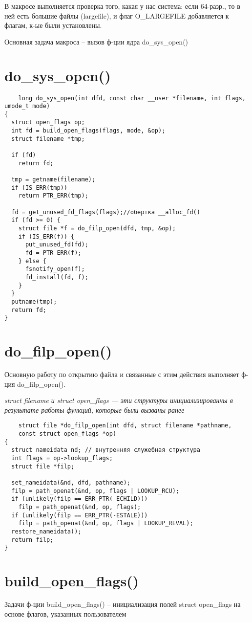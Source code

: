 В макросе выполняется проверка того, какая у нас система: если 64-разр., то в ней есть большие файлы (largefile), и флаг O\_LARGEFILE добавляется к флагам, к-ые были установлены.

Основная задача макроса -- вызов ф-ции ядра do\_sys\_open()

\section{do\_sys\_open()}
\begin{lstlisting}
    long do_sys_open(int dfd, const char __user *filename, int flags, umode_t mode)
{
  struct open_flags op;
  int fd = build_open_flags(flags, mode, &op);
  struct filename *tmp;

  if (fd)
    return fd;

  tmp = getname(filename);
  if (IS_ERR(tmp))
    return PTR_ERR(tmp);

  fd = get_unused_fd_flags(flags);//обертка __alloc_fd()
  if (fd >= 0) {
    struct file *f = do_filp_open(dfd, tmp, &op);
    if (IS_ERR(f)) {
      put_unused_fd(fd);
      fd = PTR_ERR(f);
    } else {
      fsnotify_open(f);
      fd_install(fd, f);
    }
  }
  putname(tmp);
  return fd;
}
\end{lstlisting}

\section{do\_filp\_open()}
Основную работу по открытию файла и связанные с этим действия выполняет ф-ция do\_filp\_open().

\textit{struct filename и struct open\_flags --- эти структуры инициализированны в результате работы функций, которые были вызваны ранее}

\begin{lstlisting}
    struct file *do_filp_open(int dfd, struct filename *pathname,
    const struct open_flags *op)
{
  struct nameidata nd; // внутренняя служебная структура
  int flags = op->lookup_flags;
  struct file *filp;

  set_nameidata(&nd, dfd, pathname);
  filp = path_openat(&nd, op, flags | LOOKUP_RCU);
  if (unlikely(filp == ERR_PTR(-ECHILD)))
    filp = path_openat(&nd, op, flags);
  if (unlikely(filp == ERR_PTR(-ESTALE)))
    filp = path_openat(&nd, op, flags | LOOKUP_REVAL);
  restore_nameidata();
  return filp;
}
\end{lstlisting}

\section{build\_open\_flags()}
Задачи ф-ции build\_open\_flags() -- инициализация полей struct open\_flags на основе флагов, указанных пользователем

